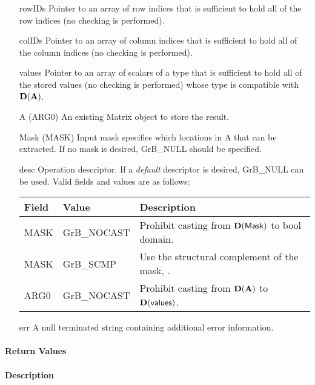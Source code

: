\begin{itemize}[leftmargin=1.1in]
    \item[{\sf rowIDs}] Pointer to an array of row indices that is sufficient to
                        hold all of the row indices (no checking is performed).
    \item[{\sf colIDs}] Pointer to an array of column indices that is sufficient to
                        hold all of the column indices (no checking is performed). 
    \item[{\sf values}] Pointer to an array of scalars of a type that is sufficient to
                        hold all of the stored values (no checking is performed) whose
                        type is compatible with $\bold{D}({\bf A})$.
    \item[{\sf A}]      ({\sf ARG0}) An existing Matrix object to store the result.
    \item[{\sf Mask}]   ({\sf MASK}) Input mask specifies which locations in
                        {\sf A} that can be extracted.  If no mask is desired,
                        {\sf GrB\_NULL} should be specified.
    \item[{\sf desc}]   Operation descriptor. If a
    \emph{default} descriptor is desired, {\sf GrB\_NULL} can be
    used.  Valid fields and values are as follows: \\
    \begin{tabular}{lll}
    Field  & Value & Description \\
    \hline
    {\sf MASK} & {\sf GrB\_NOCAST} & Prohibit casting from $\bold{D}({\sf Mask})$ to {\sf bool} domain. \\
    {\sf MASK} & {\sf GrB\_SCMP}   & Use the structural complement of the mask, . \\
    {\sf ARG0} & {\sf GrB\_NOCAST} & Prohibit casting from $\bold{D}({\bf A})$ to $\bold{D}({\sf values})$. \\
    \end{tabular}
    \item[{\sf err}]     A null terminated string containing additional error information.
\end{itemize}

\paragraph{Return Values}
%
\paragraph{Description}


